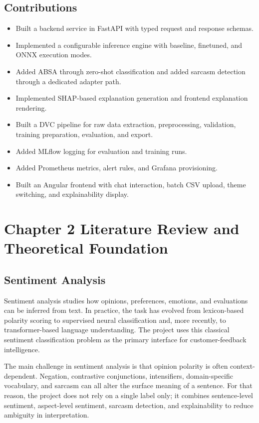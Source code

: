 \documentclass[12pt, a4paper]{article}
\begin{document}
\subsection{Contributions}
\begin{itemize}[noitemsep]
  \item Built a backend service in FastAPI with typed request and response schemas.
  \item Implemented a configurable inference engine with baseline, finetuned, and ONNX execution modes.
  \item Added ABSA through zero-shot classification and added sarcasm detection through a dedicated adapter path.
  \item Implemented SHAP-based explanation generation and frontend explanation rendering.
  \item Built a DVC pipeline for raw data extraction, preprocessing, validation, training preparation, evaluation, and export.
  \item Added MLflow logging for evaluation and training runs.
  \item Added Prometheus metrics, alert rules, and Grafana provisioning.
  \item Built an Angular frontend with chat interaction, batch CSV upload, theme switching, and explainability display.
\end{itemize}

\section{Chapter 2 Literature Review and Theoretical Foundation}

\subsection{Sentiment Analysis}
Sentiment analysis studies how opinions, preferences, emotions, and evaluations can be inferred from text. In practice, the task has evolved from lexicon-based polarity scoring to supervised neural classification and, more recently, to transformer-based language understanding. The project uses this classical sentiment classification problem as the primary interface for customer-feedback intelligence.

The main challenge in sentiment analysis is that opinion polarity is often context-dependent. Negation, contrastive conjunctions, intensifiers, domain-specific vocabulary, and sarcasm can all alter the surface meaning of a sentence. For that reason, the project does not rely on a single label only; it combines sentence-level sentiment, aspect-level sentiment, sarcasm detection, and explainability to reduce ambiguity in interpretation.
\end{document}
